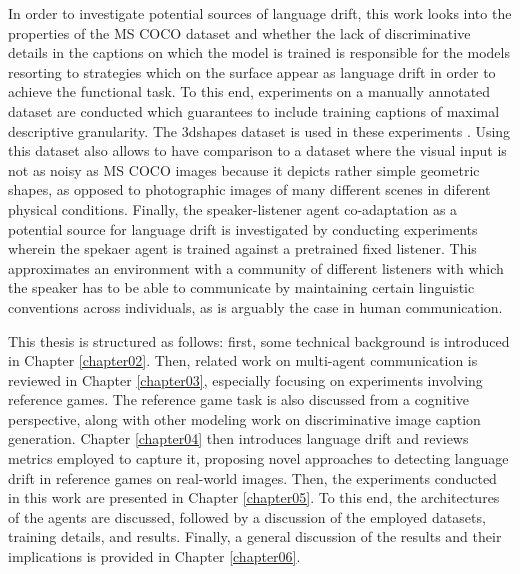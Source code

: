 In order to investigate potential sources of language drift, this work looks into the properties of the MS COCO dataset and whether the lack of discriminative details in the captions on which the model is trained is responsible for the models resorting to strategies which on the surface appear as language drift in order to achieve the functional task. To this end, experiments on a manually annotated dataset are conducted which guarantees to include training captions of maximal descriptive granularity. The 3dshapes dataset is used in these experiments \parencite{burgess20183d}. Using this dataset also allows to have comparison to a dataset where the visual input is not as noisy as MS COCO images because it depicts rather simple geometric shapes, as opposed to photographic images of many different scenes in diferent physical conditions. Finally, the speaker-listener agent co-adaptation as a potential source for language drift is investigated by conducting experiments wherein the spekaer agent is trained against a pretrained fixed listener. This approximates an environment with a community of different listeners with which the speaker has to be able to communicate by maintaining certain linguistic conventions across individuals, as is arguably the case in human communication. 


This thesis is structured as follows: first, some technical background is introduced in Chapter \ref{chapter02}. Then, related work on multi-agent communication is reviewed in Chapter \ref{chapter03}, especially focusing on experiments involving reference games. The reference game task is also discussed from a cognitive perspective, along with other modeling work on discriminative image caption generation. Chapter \ref{chapter04} then introduces language drift and reviews metrics employed to capture it, proposing novel approaches to detecting language drift in reference games on real-world images. Then, the experiments conducted in this work are presented in Chapter \ref{chapter05}. To this end, the architectures of the agents are discussed, followed by a discussion of the employed datasets, training details, and results. Finally, a general discussion of the results and their implications is provided in Chapter \ref{chapter06}. %

